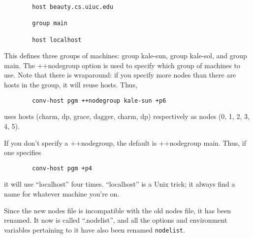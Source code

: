 \begin{itemize}
\begin{verbatim}
        host beauty.cs.uiuc.edu
         
        group main
         
        host localhost
\end{verbatim}

This defines three groups of machines: group kale-sun, group kale-sol,
and group main.  The ++nodegroup option is used to specify which group
of machines to use.  Note that there is wraparound: if you specify
more nodes than there are hosts in the group, it will reuse
hosts. Thus,

\begin{verbatim}
        conv-host pgm ++nodegroup kale-sun +p6
\end{verbatim}

uses hosts (charm, dp, grace, dagger, charm, dp) respectively as
nodes (0, 1, 2, 3, 4, 5).

If you don't specify a ++nodegroup, the default is ++nodegroup main.
Thus, if one specifies

\begin{verbatim}
        conv-host pgm +p4
\end{verbatim}

it will use ``localhost'' four times.  ``localhost'' is a Unix
trick; it always find a name for whatever machine you're on.

Since the new nodes file is incompatible with the old nodes file, it has
been renamed.  It now is called ``.nodelist'', and all the options and
environment variables pertaining to it have also been renamed {\tt nodelist}.


\end{itemize}

